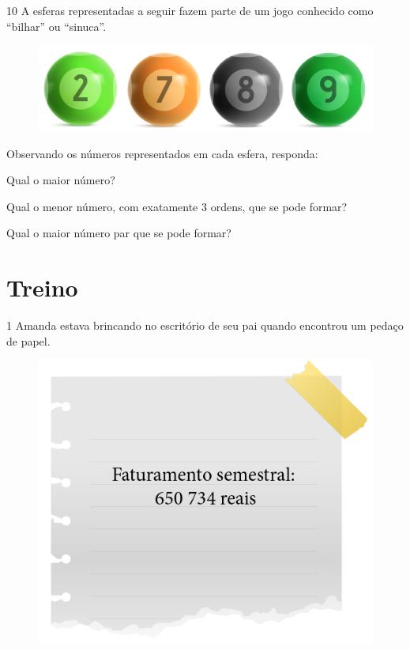 
\pagebreak
\num{10} A esferas representadas a seguir fazem parte de um jogo conhecido como
“bilhar” ou “sinuca”.

\begin{figure}[htpb!]
\includegraphics[width=\textwidth]{../ilustracoes/MAT5/SAEB_5ANO_MAT_figura11.png}
\end{figure}

Observando os números representados em cada esfera, responda:

\begin{escolha}
\item  Qual o maior número?


\item  Qual o menor número, com exatamente 3 ordens, que se pode formar?


\item  Qual o maior número par que se pode formar?


\end{escolha}


\pagebreak
\section{Treino}


\num{1} Amanda estava brincando no escritório de seu pai quando encontrou um pedaço de papel.

\begin{figure}[htpb!]
\centering
\includegraphics[width=.4\textwidth]{../ilustracoes/MAT5/SAEB_5ANO_MAT_figura12.png}
\end{figure}

